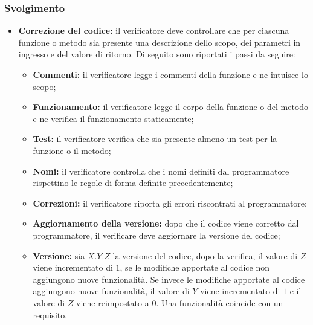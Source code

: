 \subsubsection*{Svolgimento}
\begin{itemize}
	\item \textbf{Correzione del codice:} il verificatore deve controllare che per
	      ciascuna funzione o metodo sia presente una descrizione dello scopo,
	      dei parametri in ingresso e del valore di ritorno. Di seguito sono
	      riportati i passi da seguire:
	      \begin{itemize}
		      \item \textbf{Commenti:} il verificatore legge i commenti della
		            funzione e ne intuisce lo scopo;

		      \item \textbf{Funzionamento:} il verificatore legge il corpo
		            della funzione o del metodo e ne verifica il funzionamento
		            staticamente;

		      \item \textbf{Test:} il verificatore verifica che sia
		            presente almeno un test per la funzione o il metodo;


		      \item \textbf{Nomi:} il verificatore controlla che i nomi definiti
		            dal programmatore rispettino le regole di forma definite
		            precedentemente;

		      \item \textbf{Correzioni:} il verificatore riporta
		            gli errori riscontrati al programmatore;

		      \item \textbf{Aggiornamento della versione:} dopo che il codice
		            viene corretto dal programmatore, il verificare deve aggiornare
		            la versione del codice;

		      \item \textbf{Versione:} sia $X.Y.Z$ la versione del codice,
		            dopo la verifica, il valore di $Z$ viene incrementato di
		            $1$, se le modifiche apportate al codice non aggiungono
		            nuove funzionalità. Se invece le modifiche apportate al
		            codice aggiungono nuove funzionalità, il valore di $Y$ viene
		            incrementato di $1$ e il valore di $Z$ viene reimpostato a
		            $0$. Una funzionalità coincide con un requisito.
	      \end{itemize}
\end{itemize}


